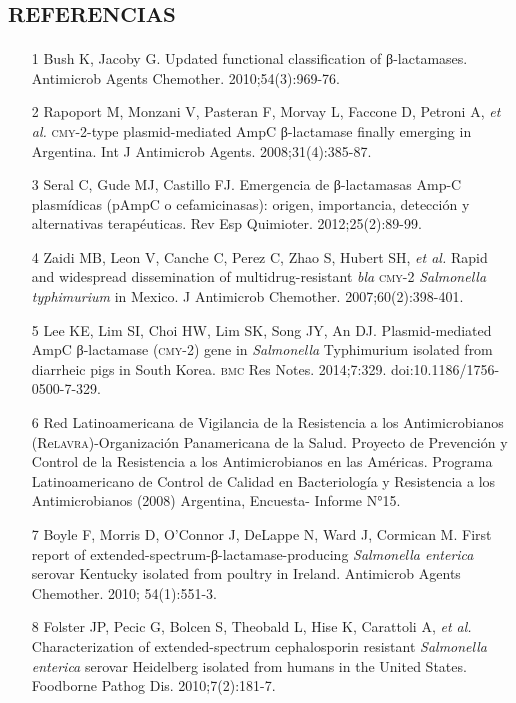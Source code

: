 \documentclass{article}
\begin{document}
\section*{\textsc{referencias}}
\begin{itemize}

\item[1] Bush K, Jacoby G. Updated functional classification of β-lactamases.
Antimicrob Agents Chemother. 2010;54(3):969-76.

\item[2] Rapoport M, Monzani V, Pasteran F, Morvay L, Faccone D, Petroni A,
\textit{et al.}
\textsc{cmy}-2-type plasmid-mediated AmpC β-lactamase finally emerging in Argentina. Int
J Antimicrob Agents. 2008;31(4):385-87.

\item[3] Seral C, Gude MJ, Castillo FJ. Emergencia de β-lactamasas Amp-C
plasmídicas (pAmpC o cefamicinasas): origen, importancia, detección y
alternativas terapéuticas. Rev Esp Quimioter. 2012;25(2):89-99.

\item[4] Zaidi MB, Leon V, Canche C, Perez C, Zhao S, Hubert SH, \textit{et
al.}
Rapid and widespread dissemination of multidrug-resistant \textit{bla}
\textsc{cmy}-2 \textit{Salmonella typhimurium}
in Mexico. J Antimicrob Chemother. 2007;60(2):398-401.

\item[5] Lee KE, Lim SI, Choi HW, Lim SK, Song JY, An DJ. Plasmid-mediated
AmpC β-lactamase (\textsc{cmy}-2) gene in \textit{Salmonella}
Typhimurium isolated from diarrheic pigs in South Korea. \textsc{bmc} Res Notes.
2014;7:329. doi:10.1186/1756-0500-7-329.

\item[6] Red Latinoamericana de Vigilancia de la Resistencia a los
Antimicrobianos (Re\textsc{lavra})-Organización Panamericana de la Salud. Proyecto de
Prevención y Control de la Resistencia a los Antimicrobianos en las Américas.
Programa Latinoamericano de Control de Calidad en Bacteriología y Resistencia a
los Antimicrobianos (2008) Argentina, Encuesta- Informe N°15.

\item[7] Boyle F, Morris D, O’Connor J, DeLappe N, Ward J, Cormican M. First
report of extended-spectrum-β-lactamase-producing \textit{Salmonella enterica}
serovar Kentucky isolated from poultry in Ireland. Antimicrob Agents Chemother.
2010; 54(1):551-3.

\item[8] Folster JP, Pecic G, Bolcen S, Theobald L, Hise K, Carattoli A,
\textit{et al.}
Characterization of extended-spectrum cephalosporin resistant \textit{Salmonella
enterica}
serovar Heidelberg isolated from humans in the United States. Foodborne Pathog
Dis. 2010;7(2):181-7.


\end{itemize}
\end{document}
